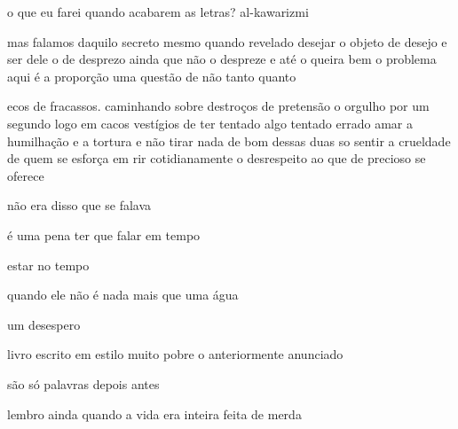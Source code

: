 \begin{poem}
\begin{stanza}
o que eu farei\verseline
quando acabarem as letras?\verseline
al-kawarizmi
\end{stanza}
\begin{stanza}
mas falamos daquilo\verseline
\qquad \qquad secreto\verseline
mesmo quando revelado\verseline
desejar o objeto\verseline
\qquad de desejo\verseline
e ser dele o\verseline
\qquad de desprezo\verseline
ainda que não o despreze\verseline
e até o queira bem\verseline
o problema aqui é\verseline
a proporção\verseline
uma questão\verseline
de não tanto quanto
\end{stanza}
\begin{stanza}
ecos de fracassos. \qquad caminhando\verseline
sobre destroços de pretensão\verseline
\qquad o orgulho por um segundo\verseline
\qquad logo em cacos\verseline
vestígios de ter tentado algo\verseline
tentado errado\verseline
\qquad \qquad *\verseline
amar a humilhação e a tortura\verseline
e não tirar nada de bom\verseline
dessas duas \qquad so sentir\verseline
a crueldade\verseline
de quem se esforça em rir\verseline
cotidianamente o desrespeito\verseline
ao que de precioso\verseline
se oferece\verseline
\qquad \qquad *
\end{stanza}
\begin{stanza}
não era disso que se falava
\end{stanza}
\begin{stanza}
é uma pena ter que falar em tempo
\end{stanza}
\begin{stanza}
estar no tempo
\end{stanza}
\begin{stanza}
quando ele não é nada\verseline
mais que uma água
\end{stanza}
\begin{stanza}
um desespero
\end{stanza}
\begin{stanza}
livro escrito em estilo muito pobre\verseline
o anteriormente anunciado
\end{stanza}
\begin{stanza}
são só palavras \qquad depois \qquad antes
\end{stanza}
\begin{stanza}
\qquad \qquad *
\end{stanza}
\begin{stanza}
lembro ainda quando a vida\verseline
era inteira\verseline
feita de merda
\end{stanza}

\end{poem}
